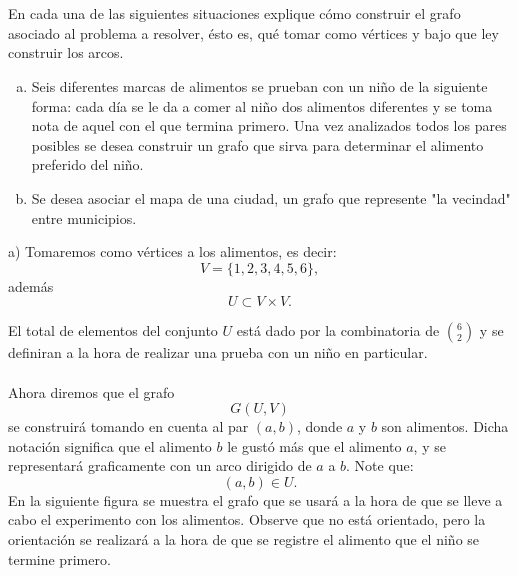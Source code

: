 \documentclass[autocontact]{gaceta}
\begin{document}
 


\section{}
    En cada una de las siguientes situaciones explique cómo construir el grafo asociado al
    problema a resolver, ésto es, qué tomar como vértices y bajo que ley construir los 
    arcos.
    \begin{enumerate}[a)]
        \item Seis diferentes marcas de alimentos se prueban con un niño de la siguiente 
            forma: cada día se le da a comer al niño dos alimentos diferentes y se toma nota
            de aquel con el que termina primero. Una vez analizados todos los pares posibles
            se desea construir un grafo que sirva para determinar el alimento preferido del 
            niño.
        \item Se desea asociar el mapa de una ciudad, un grafo que represente "la vecindad"
            entre municipios.
    \end{enumerate}

    a) Tomaremos como vértices a los alimentos, es decir:\\
    \begin{equation}
        V = \{1,2,3,4,5,6\},
    \end{equation}
    además
    \begin{equation}
        U \subset V \times V.
    \end{equation}

    El total de elementos del conjunto $U$ está dado por la combinatoria de ${6 \choose 2}$ y
    se definiran a la hora de realizar una prueba con un niño en particular.\\
    \\Ahora diremos que el grafo
    \begin{equation}
        G(U,V)
    \end{equation}
    se construirá tomando en cuenta al par $(a, b)$, donde $a$ y $b$ son alimentos. Dicha
    notación significa que el alimento $b$ le gustó más que el alimento $a$, y se representará
    graficamente con un arco dirigido de $a$ a $b$. Note que:
    \begin{equation}
        (a,b) \in U.
    \end{equation}
    En la siguiente figura se muestra el grafo que se usará a la hora de que se lleve a cabo 
    el experimento con los alimentos. Observe que no está orientado, pero la orientación 
    se realizará a la hora de que se registre el alimento que el niño se termine primero.
\end{document}
